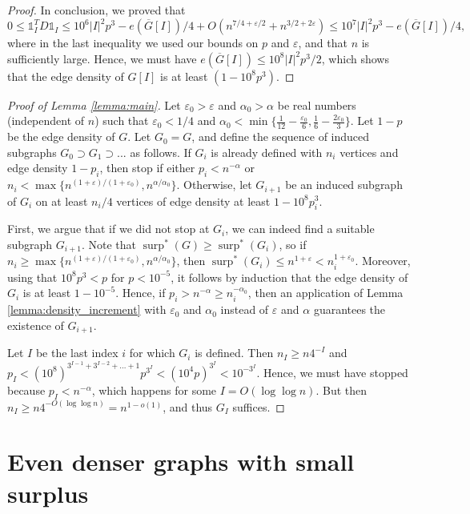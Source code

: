 \documentclass[11pt]{article}
\theoremstyle{plain}
\theoremstyle{definition}
\DeclareMathOperator{\surp}{surp}
\newcommand{\eps}{\varepsilon}
\begin{document}
\begin{proof}
In conclusion, we proved that 
$$0\leq \mathds{1}^T_I D\mathds{1}_I\leq 10^6|I|^2p^3-e(\overline{G}[I])/4+O(n^{7/4+\eps/2}+n^{3/2+2\eps})\leq 10^7|I|^2p^3-e(\overline{G}[I])/4,$$
where in the last inequality we used our bounds on $p$ and $\eps$, and that $n$ is sufficiently large. Hence, we must have $e(\overline{G}[I])\leq 10^8 |I|^2p^3/2$, which shows that the edge density of $G[I]$ is at least $(1-10^8p^3)$.
\end{proof}


\begin{proof}[Proof of Lemma \ref{lemma:main}]
    Let $\eps_0>\eps$ and $\alpha_0>\alpha$ be real numbers (independent of $n$) such that $\eps_0<1/4$ and $\alpha_0<\min\{\frac{1}{12}-\frac{\eps_0}{6},\frac{1}{6}-\frac{2\eps_0}{3}\}$. Let $1-p$ be the edge density of $G$. Let $G_0=G$, and define the sequence of induced subgraphs $G_0\supset G_1\supset...$ as follows. If $G_i$ is already defined with $n_i$ vertices and edge density $1-p_i$, then stop if either $p_i<n^{-\alpha}$ or $n_i<\max\{n^{(1+\eps)/(1+\eps_0)},n^{\alpha/\alpha_0}\}$. Otherwise, let $G_{i+1}$ be an induced subgraph of $G_i$ on at least $n_i/4$ vertices of edge density at least $1-10^8p_i^3$. 

    First, we argue that if we did not stop at $G_i$, we can indeed find a suitable subgraph $G_{i+1}$. Note that $\surp^*(G)\geq \surp^*(G_i)$, so if $n_i\geq \max\{n^{(1+\eps)/(1+\eps_0)},n^{\alpha/\alpha_0}\}$, then $\surp^*(G_i)\leq n^{1+\eps}<n_i^{1+\eps_0}$. Moreover, using that $10^8p^3<p$ for $p<10^{-5}$, it follows by induction that the edge density of $G_i$ is at least $1-10^{-5}$. Hence, if $p_i>n^{-\alpha}\geq n_i^{-\alpha_0}$, then  an application of Lemma \ref{lemma:density_increment} with $\eps_0$ and $\alpha_0$ instead of $\eps$ and $\alpha$ guarantees the existence of $G_{i+1}$.
    
     Let $I$ be the last index $i$ for which $G_i$ is defined. Then $n_I\geq n4^{-I}$ and $p_{I}<(10^{8})^{3^{I-1}+3^{I-2}+\dots+1}p^{3^I}<(10^4p)^{3^I}<10^{-3^I}$. Hence, we must have stopped because $p_{I}<n^{-\alpha}$, which happens for some $I=O(\log \log n)$. But then $n_I\geq n4^{-O(\log\log n)}=n^{1-o(1)}$, and thus $G_I$ suffices.
\end{proof}


\section{Even denser graphs with small surplus}\label{sect:2}
\end{document}
